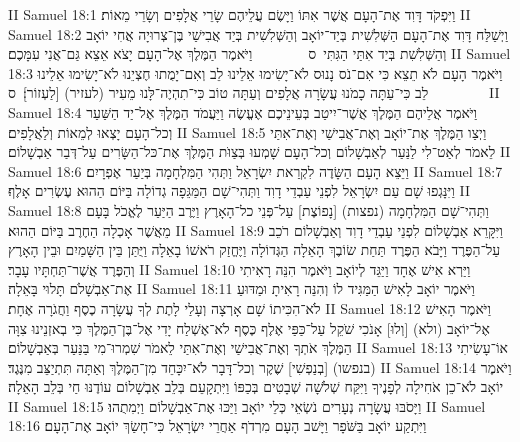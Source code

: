 II Samuel 18:1	וַיִּפְקֹד דָּוִד אֶת־הָעָם אֲשֶׁר אִתּוֹ וַיָּשֶׂם עֲלֵיהֶם שָׂרֵי אֲלָפִים וְשָׂרֵי מֵאוֹת׃
II Samuel 18:2	וַיְשַׁלַּח דָּוִד אֶת־הָעָם הַשְּׁלִשִׁית בְּיַד־יוֹאָב וְהַשְּׁלִשִׁית בְּיַד אֲבִישַׁי בֶּן־צְרוּיָה אֲחִי יוֹאָב וְהַשְּׁלִשִׁת בְּיַד אִתַּי הַגִּתִּי {ס}        וַיֹּאמֶר הַמֶּלֶךְ אֶל־הָעָם יָצֹא אֵצֵא גַּם־אֲנִי עִמָּכֶם׃
II Samuel 18:3	וַיֹּאמֶר הָעָם לֹא תֵצֵא כִּי אִם־נֹס נָנוּס לֹא־יָשִׂימוּ אֵלֵינוּ לֵב וְאִם־יָמֻתוּ חֶצְיֵנוּ לֹא־יָשִׂימוּ אֵלֵינוּ לֵב כִּי־עַתָּה כָמֹנוּ עֲשָׂרָה אֲלָפִים וְעַתָּה טוֹב כִּי־תִהְיֶה־לָּנוּ מֵעִיר (לעזיר) [לַעְזוֹר]׃ {ס}        
II Samuel 18:4	וַיֹּאמֶר אֲלֵיהֶם הַמֶּלֶךְ אֲשֶׁר־יִיטַב בְּעֵינֵיכֶם אֶעֱשֶׂה וַיַּעֲמֹד הַמֶּלֶךְ אֶל־יַד הַשַּׁעַר וְכל־הָעָם יָצְאוּ לְמֵאוֹת וְלַאֲלָפִים׃
II Samuel 18:5	וַיְצַו הַמֶּלֶךְ אֶת־יוֹאָב וְאֶת־אֲבִישַׁי וְאֶת־אִתַּי לֵאמֹר לְאַט־לִי לַנַּעַר לְאַבְשָׁלוֹם וְכל־הָעָם שָׁמְעוּ בְּצַוֺּת הַמֶּלֶךְ אֶת־כּל־הַשָּׂרִים עַל־דְּבַר אַבְשָׁלוֹם׃
II Samuel 18:6	וַיֵּצֵא הָעָם הַשָּׂדֶה לִקְרַאת יִשְׂרָאֵל וַתְּהִי הַמִּלְחָמָה בְּיַעַר אֶפְרָיִם׃
II Samuel 18:7	וַיִּנָּגְפוּ שָׁם עַם יִשְׂרָאֵל לִפְנֵי עַבְדֵי דָוִד וַתְּהִי־שָׁם הַמַּגֵּפָה גְדוֹלָה בַּיּוֹם הַהוּא עֶשְׂרִים אָלֶף׃
II Samuel 18:8	וַתְּהִי־שָׁם הַמִּלְחָמָה (נפצות) [נָפוֹצֶת] עַל־פְּנֵי כל־הָאָרֶץ וַיֶּרֶב הַיַּעַר לֶאֱכֹל בָּעָם מֵאֲשֶׁר אָכְלָה הַחֶרֶב בַּיּוֹם הַהוּא׃
II Samuel 18:9	וַיִּקָּרֵא אַבְשָׁלוֹם לִפְנֵי עַבְדֵי דָוִד וְאַבְשָׁלוֹם רֹכֵב עַל־הַפֶּרֶד וַיָּבֹא הַפֶּרֶד תַּחַת שׂוֹבֶךְ הָאֵלָה הַגְּדוֹלָה וַיֶּחֱזַק רֹאשׁוֹ בָאֵלָה וַיֻּתַּן בֵּין הַשָּׁמַיִם וּבֵין הָאָרֶץ וְהַפֶּרֶד אֲשֶׁר־תַּחְתָּיו עָבָר׃
II Samuel 18:10	וַיַּרְא אִישׁ אֶחָד וַיַּגֵּד לְיוֹאָב וַיֹּאמֶר הִנֵּה רָאִיתִי אֶת־אַבְשָׁלֹם תָּלוּי בָּאֵלָה׃
II Samuel 18:11	וַיֹּאמֶר יוֹאָב לָאִישׁ הַמַּגִּיד לוֹ וְהִנֵּה רָאִיתָ וּמַדּוּעַ לֹא־הִכִּיתוֹ שָׁם אָרְצָה וְעָלַי לָתֶת לְךָ עֲשָׂרָה כֶסֶף וַחֲגֹרָה אֶחָת׃
II Samuel 18:12	וַיֹּאמֶר הָאִישׁ אֶל־יוֹאָב (ולא) [וְלוּ] אָנֹכִי שֹׁקֵל עַל־כַּפַּי אֶלֶף כֶּסֶף לֹא־אֶשְׁלַח יָדִי אֶל־בֶּן־הַמֶּלֶךְ כִּי בְאזְנֵינוּ צִוָּה הַמֶּלֶךְ אֹתְךָ וְאֶת־אֲבִישַׁי וְאֶת־אִתַּי לֵאמֹר שִׁמְרוּ־מִי בַּנַּעַר בְּאַבְשָׁלוֹם׃
II Samuel 18:13	אוֹ־עָשִׂיתִי (בנפשו) [בְנַפְשִׁי] שֶׁקֶר וְכל־דָּבָר לֹא־יִכָּחֵד מִן־הַמֶּלֶךְ וְאַתָּה תִּתְיַצֵּב מִנֶּגֶד׃
II Samuel 18:14	וַיֹּאמֶר יוֹאָב לֹא־כֵן אֹחִילָה לְפָנֶיךָ וַיִּקַּח שְׁלֹשָׁה שְׁבָטִים בְּכַפּוֹ וַיִּתְקָעֵם בְּלֵב אַבְשָׁלוֹם עוֹדֶנּוּ חַי בְּלֵב הָאֵלָה׃
II Samuel 18:15	וַיָּסֹבּוּ עֲשָׂרָה נְעָרִים נֹשְׂאֵי כְּלֵי יוֹאָב וַיַּכּוּ אֶת־אַבְשָׁלוֹם וַיְמִתֻהוּ׃
II Samuel 18:16	וַיִּתְקַע יוֹאָב בַּשֹּׁפָר וַיָּשׁב הָעָם מִרְדֹף אַחֲרֵי יִשְׂרָאֵל כִּי־חָשַׂךְ יוֹאָב אֶת־הָעָם׃
